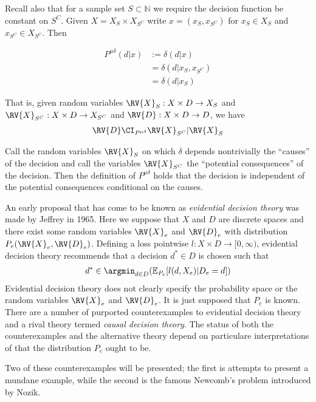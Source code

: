Recall also that for a sample set $S\subset \mathbb{N}$ we require the decision function be constant on $S^C$. Given $X=X_S\times X_{S^C}$ write $x=(x_S,x_{S^C})$ for $x_S\in X_S$ and $x_{S^C}\in X_{S^C}$. Then

\begin{align}
    P^{\mu\delta}(d|x) &:= \delta(d|x)\\
                        &= \delta(d|x_S,x_{S^C})\\
                        &= \delta(d|x_S)
\end{align}

That is, given random variables $\RV{X}_S:X\times D \to X_S$ and $\RV{X}_{S^C}:X\times D\to X_{S^C}$ and $\RV{D}:X\times D\to D$, we have
\begin{align}
    \RV{D}\CI_{P^{\mu\delta}} \RV{X}_{S^C} | \RV{X}_S
\end{align}

Call the random variables $\RV{X}_S$ on which $\delta$ depends nontrivially the ``causes'' of the decision and call the variables $\RV{X}_{S^C}$ the ``potential consequences'' of the decision. Then the definition of $P^{\mu\delta}$ holds that the decision is independent of the potential consequences conditional on the causes.

An early proposal that has come to be known as \emph{evidential decision theory} was made by Jeffrey in 1965. Here we suppose that $X$ and $D$ are discrete spaces and there exist some random variables $\RV{X}_e$ and $\RV{D}_e$ with distribution $P_{e}(\RV{X}_e,\RV{D}_e)$\cite{jeffrey_logic_1990}. Defining a loss pointwise $l:X\times D\to [0,\infty)$, evidential decision theory recommends that a decision $d^*\in D$ is chosen such that
\begin{align}
    d^*\in \argmin_{d\in D} (\mathbb{E}_{P_{e}}[l(d,X_e)|D_e=d])
\end{align}
Evidential decision theory does not clearly specify the probability space or the random variables $\RV{X}_e$ and $\RV{D}_e$. It is just supposed that $P_{e}$ is known. There are a number of purported counterexamples to evidential decision theory and a rival theory termed \emph{causal decision theory}. The status of both the counterexamples and the alternative theory depend on particulare interpretations of that the distribution $P_e$ ought to be.

Two of these counterexamples will be presented; the first is attempts to present a mundane example, while the second is the famous Newcomb's problem introduced by Nozik\cite{nozick_newcombs_1969}.

